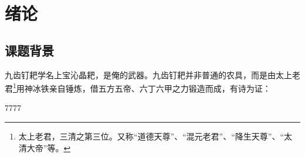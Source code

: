\chapter{绪论}

\section{课题背景}

九齿钉耙学名{\kaishu 上宝沁晶耙}，是俺的武器。九齿钉耙并非普通的农具，而是由太上老君\footnote{太上老君，三清之第三位。又称“道德天尊”、“混元老君”、“降生天尊”、“太清大帝”等。}用神冰铁亲自锤炼，借五方五帝、六丁六甲之力锻造而成，有诗为证：

7777

